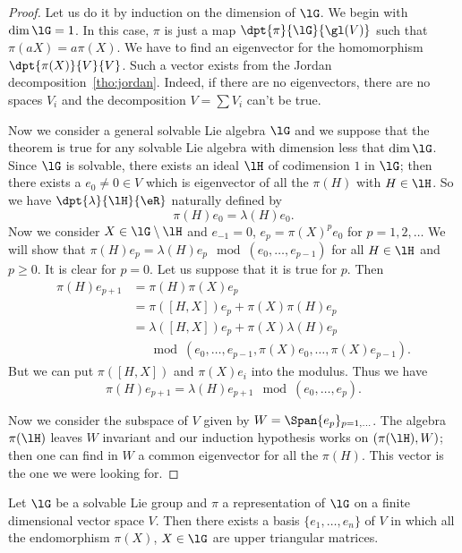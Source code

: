 \begin{proof}
Let us do it by induction on the dimension of $\lG$. We begin with $\dim\lG=1$. In this case, $\pi$ is just a map $\dpt{\pi}{\lG}{\gl(V)}$ such that $\pi(aX)=a\pi(X)$. We have to find an eigenvector for the homomorphism $\dpt{\pi(X)}{V}{V}$. Such a vector exists  from the Jordan decomposition~\ref{tho:jordan}. Indeed, if there are no eigenvectors, there are no spaces $V_i$ and the decomposition $V=\sum V_i$ can't be true.

Now we consider a general solvable Lie algebra $\lG$ and we suppose that the theorem is true for any solvable Lie algebra with dimension less that $\dim\lG$. Since $\lG$ is solvable, there exists an ideal $\lH$ of codimension $1$ in $\lG$; then there exists a $e_0\neq 0\in V$ which is eigenvector of all the $\pi(H)$ with $H\in\lH$. So we have $\dpt{\lambda}{\lH}{\eR}$ naturally defined by
\[
  \pi(H)e_0=\lambda(H)e_0.
\]
Now we consider $X\in\lG\setminus\lH$ and $e_{-1}=0$, $e_p=\pi(X)^pe_0$ for $p=1,2,\ldots$ We will show that $\pi(H)e_p=\lambda(H)e_p\mod(e_0,\ldots,e_{p-1})$ for all $H\in\lH$ and $p\geq 0$. It is clear for $p=0$. Let us suppose that it is true for $p$. Then
\begin{equation}
\begin{split}
  \pi(H)e_{p+1}&=\pi(H)\pi(X)e_p\\
               &=\pi([H,X])e_p+\pi(X)\pi(H)e_p\\
           &=\lambda([H,X])e_p+\pi(X)\lambda(H)e_p\\
                      &\quad\mod(e_0,\ldots,e_{p-1},\pi(X)e_0,\ldots,\pi(X)e_{p-1}).
\end{split}
\end{equation}
But we can put $\pi([H,X])$ and $\pi(X)e_i$ into the modulus. Thus we have
\[
  \pi(H)e_{p+1}=\lambda(H)e_{p+1}\mod(e_0,\ldots,e_p).
\]

Now we consider the subspace of $V$ given by $W=\Span\{e_p\}_{p=1,\ldots}$. The algebra $\pi(\lH)$ leaves $W$ invariant and our induction hypothesis works on $(\pi(\lH),W)$; then one can find in $W$ a common eigenvector for all the $\pi(H)$. This vector is the one we were looking for.
\end{proof}

\begin{corollary}
Let $\lG$ be a solvable Lie group and $\pi$ a representation of $\lG$ on a finite dimensional vector space $V$. Then there exists a basis $\{e_1,\ldots,e_n\}$ of $V$ in which all the endomorphism $\pi(X)$, $X\in\lG$ are upper triangular matrices.
\label{cor:de_Lie_Vu}
\end{corollary}


